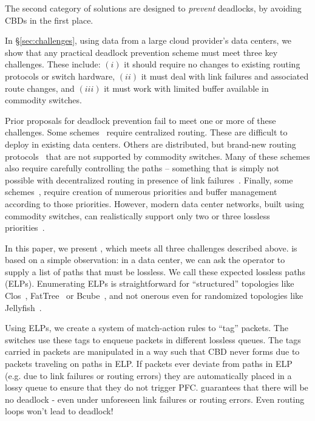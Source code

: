 The second category of solutions are designed to {\em prevent} deadlocks, by avoiding CBDs in the first place.

In \S\ref{sec:challenges}, using data from a large cloud provider's data
centers, we show that any practical deadlock prevention scheme must meet three
key challenges. These include: $(i)$ it should require no changes to existing
routing protocols or switch hardware, $(ii)$ it must deal with link failures and
associated  route changes, and $(iii)$ it must work with limited buffer
available in commodity switches.

Prior proposals for deadlock prevention fail to meet one or more of these
challenges.  Some schemes~\cite{infiniband,blazewicz1994optimal} require
centralized routing.  These are difficult to deploy in existing data centers.
Others are distributed, but brand-new routing
protocols~\cite{dally,duato93,dally93,sancho2004,flich2012survey,lash,wu2003fault,glass,duato2001,domke2011,puente1999,dfedst16,tcpbolt,dfedst16}
that are not supported by commodity switches.  Many of these schemes also
require carefully controlling the paths -- something that is simply not possible
with decentralized routing in presence of link failures~\cite{netpilot}.
Finally, some schemes~\cite{firstpaper,survey,datanetworks,karol2003prevention},
require creation of numerous priorities and buffer management according to those
priorities.  However, modern data center networks, built using commodity
switches, can realistically support only two or three lossless
priorities~\cite{rdmaatscale}.

In this paper, we present \sysname{}, which meets all three challenges described
above. \sysname{} is based on a simple observation: in a data center, we can ask
the operator to supply a list of paths that must be lossless.  We call these
expected lossless paths (ELPs). Enumerating ELPs is straightforward for
``structured'' topologies like Clos~\cite{clos}, FatTree~\cite{fattree} or
Bcube~\cite{bcube}, and not onerous even for randomized topologies like
Jellyfish~\cite{jellyfish}.

Using ELPs, we create a system of match-action rules to ``tag'' packets. The
switches use these tags to enqueue packets in different lossless queues. The
tags carried in packets are manipulated in a way such that CBD never forms due
to packets traveling on paths in ELP.  If packets ever deviate from paths in ELP
(e.g. due to link failures or routing errors) they are automatically placed in a
lossy queue to ensure that they do not trigger PFC. \sysname{} guarantees that
there will be no deadlock - even under unforeseen link failures or routing
errors. Even routing loops won't lead to deadlock!

